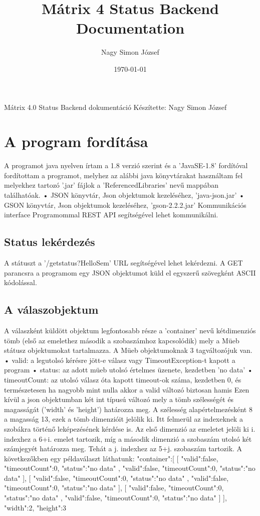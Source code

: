\documentclass[a4paper,12pt]{article}
\begin{document}
\title{Mátrix 4 Status Backend Documentation}
\author{Nagy Simon József}
\date{\today}
\maketitle

Mátrix 4.0 Status Backend dokumentáció
Készítette: Nagy Simon József
\chapter{A program fordítása}

A programot java nyelven írtam a 1.8 verzió szerint és a ’JavaSE-1.8’ fordítóval fordítottam a programot, melyhez az alábbi java könyvtárakat használtam fel melyekhez tartozó ’.jar’ fájlok a ’ReferencedLibraries’ nevű mappában találhatóak.
•	JSON könyvtár, Json objektumok kezeléséhez, ’java-json.jar’
•	GSON könyvtár, Json objektumok kezeléséhez,  ’gson-2.2.2.jar’
Kommunikációs interface
Programommal REST API segítségével lehet kommunikálni.
\section{Status lekérdezés}
A státuszt a ’/getstatus?HelloSem’ URL segítségével lehet lekérdezni. A GET parancsra a programom egy JSON objektumot küld el egyszerű szövegként ASCII kódolással.
\section{A válaszobjektum}
A válaszként küldött objektum legfontosabb része a ’container’ nevű kétdimenziós tömb (első az emelethez második a szobaszámhoz kapcsolódik) mely a Müeb státusz objektumokat tartalmazza.
A Müeb objektumoknak 3 tagváltozójuk van.
•	valid: a legutolsó kérésre jött-e válasz vagy TimeoutException-t kapott a program
•	status: az adott müeb utolsó értelmes üzenete, kezdetben ’no data’
•	timeoutCount: az utolsó válasz óta kapott timeout-ok száma, kezdetben 0, és természetesen ha nagyobb mint nulla akkor a valid változó biztosan hamis
Ezen kívül a json objektumban két int típusú változó mely a tömb szélességét és magasságát (’width’ és ’height’) határozza meg. A szélesség alapértelmezésként 8 a magasság 13, ezek a tömb dimenzióit jelölik ki. Itt felmerül az indexeknek a szobákra történő leképezésének kérdése is. Az első dimenzió az emeletet jelöli ki i. indexhez a 6+i. emelet tartozik, míg a második dimenzió a szobaszám utolsó két számjegyét határozza meg. Tehát a j. indexhez az 5+j. szobaszám tartozik. 
A következőkben egy példaválaszt láthatunk:
{
"container":[
[
{
"valid":false,
"timeoutCount":0,
"status":"no data"
},
{
"valid":false,
"timeoutCount":0,
"status":"no data"
}
],
[
{
"valid":false,
"timeoutCount":0,
"status":"no data"
},
{
"valid":false,
"timeoutCount":0,
"status":"no data"
}
],
[
{
"valid":false,
"timeoutCount":0,
"status":"no data"
},
{
"valid":false,
"timeoutCount":0,
"status":"no data"
}
]
],
"width":2,
"height":3
}
\end{document}
